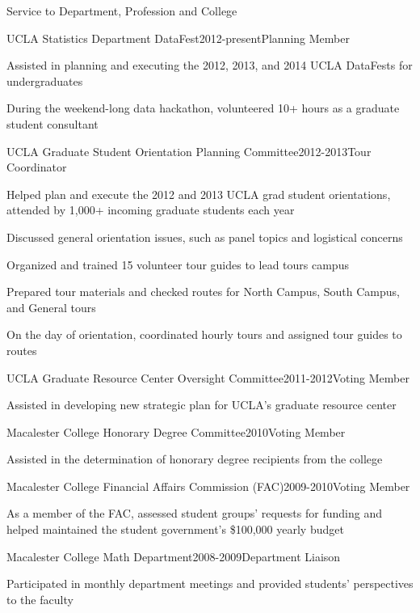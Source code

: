 \documentclass{resume} %
\begin{document}
\begin{rSection}{Service to Department, Profession and College}
\begin{rSubsection}{UCLA Statistics Department DataFest}{}{2012-present}{Planning Member}
\item Assisted in planning and executing the 2012, 2013, and 2014 UCLA DataFests for undergraduates
\item During the weekend-long data hackathon, volunteered 10+ hours as a graduate student consultant
\end{rSubsection}

\begin{rSubsection}{UCLA Graduate Student Orientation Planning Committee}{}{2012-2013}{Tour Coordinator}
\item Helped plan and execute the 2012 and 2013 UCLA grad student orientations, attended by 1,000+ incoming graduate students each year
\item Discussed general orientation issues, such as panel topics and logistical concerns
\item Organized and trained 15 volunteer tour guides to lead tours campus
\item Prepared tour materials  and checked routes for North Campus, South Campus, and General tours
\item On the day of orientation, coordinated hourly tours and assigned tour guides to routes

\end{rSubsection}

\begin{rSubsection}{UCLA Graduate Resource Center Oversight Committee}{}{2011-2012}{Voting Member}
\item Assisted in developing new strategic plan for UCLA's graduate resource center
\end{rSubsection}

\begin{rSubsection}{Macalester College Honorary Degree Committee}{}{2010}{Voting Member}
\item Assisted in the determination of honorary degree recipients from the college
\end{rSubsection}

\begin{rSubsection}{Macalester College Financial Affairs Commission (FAC)}{}{2009-2010}{Voting Member}
\item As a member of the FAC, assessed student groups' requests for funding and helped maintained the student government's \$100,000 yearly budget
\end{rSubsection}

\begin{rSubsection}{Macalester College Math Department}{}{2008-2009}{Department Liaison}
\item Participated in monthly department meetings and provided students' perspectives to the faculty
\end{rSubsection}
\end{rSection}
\end{document}
